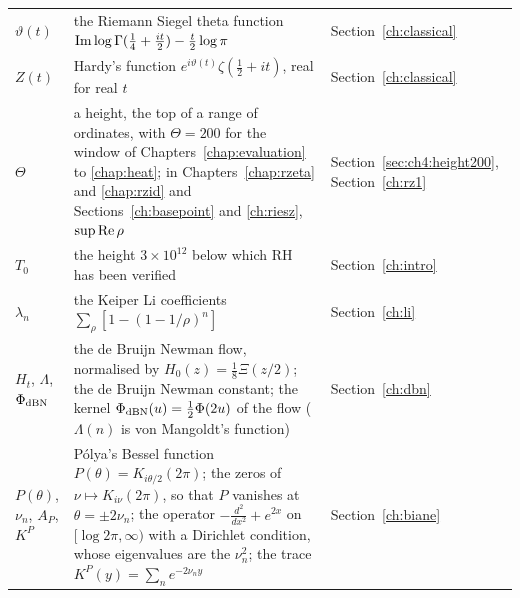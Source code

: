 {\begin{longtable}{@{}p{}p{}p{}@{}}
$\vartheta(t)$ & \raggedright the Riemann Siegel theta function ${\operatorname{Im}\log\Gamma(\frac14+\frac{it}2)-\frac t2\log\pi}$ & \raggedright Section~\ref{ch:classical}\tabularnewline
$Z(t)$ & \raggedright Hardy's function $e^{i\vartheta(t)}\zeta(\frac12+it)$, real for real $t$ & \raggedright Section~\ref{ch:classical}\tabularnewline
$\Theta$ & \raggedright a height, the top of a range of ordinates, with ${\Theta=200}$ for the window of Chapters~\ref{chap:evaluation} to \ref{chap:heat}; in Chapters~\ref{chap:rzeta} and \ref{chap:rzid} and Sections~\ref{ch:basepoint} and \ref{ch:riesz}, $\sup\operatorname{Re}\rho$ & \raggedright Section~\ref{sec:ch4:height200}, Section~\ref{ch:rz1}\tabularnewline
$T_0$ & \raggedright the height $3\times10^{12}$ below which RH has been verified \cite{PT21} & \raggedright Section~\ref{ch:intro}\tabularnewline
$\lambda_n$ & \raggedright the Keiper Li coefficients ${\sum_\rho[1-(1-1/\rho)^n]}$ & \raggedright Section~\ref{ch:li}\tabularnewline
$H_t$, $\Lambda$, $\Phi_{\rm dBN}$ & \raggedright the de Bruijn Newman flow, normalised by ${H_0(z)=\frac18\Xi(z/2)}$; the de Bruijn Newman constant; the kernel ${\Phi_{\rm dBN}(u)=\frac12\Phi(2u)}$ of the flow ($\Lambda(n)$ is von Mangoldt's function) & \raggedright Section~\ref{ch:dbn}\tabularnewline
$P(\theta)$, $\nu_n$, $A_P$, $K^P$ & \raggedright P\'olya's Bessel function ${P(\theta)=K_{i\theta/2}(2\pi)}$; the zeros of ${\nu\mapsto K_{i\nu}(2\pi)}$, so that $P$ vanishes at ${\theta=\pm2\nu_n}$; the operator ${-\frac{d^2}{dx^2}+e^{2x}}$ on ${[\log2\pi,\infty)}$ with a Dirichlet condition, whose eigenvalues are the $\nu_n^2$; the trace ${K^P(y)=\sum_ne^{-2\nu_ny}}$ & \raggedright Section~\ref{ch:biane}\tabularnewline
\bottomrule
\end{longtable}}

